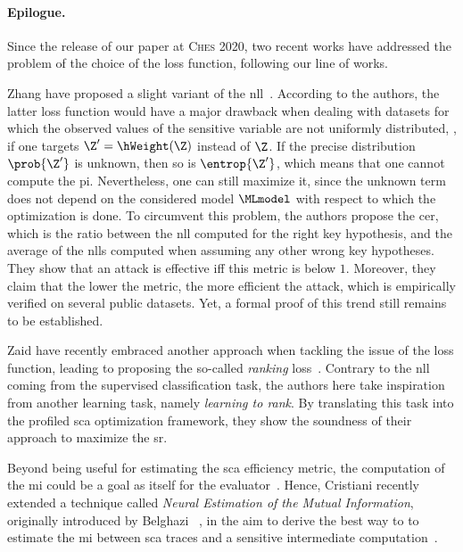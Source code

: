 \paragraph{Epilogue.}
Since the release of our paper at \textsc{Ches} 2020, two recent works have addressed the problem of the choice of the loss function, following our line of works.

Zhang \etal{} have proposed a slight variant of the \gls{nll}~\cite{zhang_novel_2020}.
According to the authors, the latter loss function would have a major drawback when dealing with datasets for which the observed values of the sensitive variable are not uniformly distributed, \eg{}, if one targets \(\Z' = \hWeight(\Z)\) instead of \(\Z\).
If the precise distribution \(\prob{\Z'}\) is unknown, then so is \(\entrop{\Z'}\), which means that one cannot compute the \gls{pi}.
Nevertheless, one can still maximize it, since the unknown term does not depend on the considered model \(\MLmodel\) with respect to which the optimization is done.
To circumvent this problem, the authors propose the \gls{cer}, which is the ratio between the \gls{nll} computed for the right key hypothesis, and the average of the \glspl{nll} computed when assuming any other wrong key hypotheses.
They show that an attack is effective \gls{iff} this metric is below \(1\).
Moreover, they claim that the lower the metric, the more efficient the attack, which is empirically verified on several public datasets.
Yet, a formal proof of this trend still remains to be established.

Zaid \etal{} have recently embraced another approach when tackling the issue of the loss function, leading to proposing the so-called \emph{ranking} loss~\cite{zaid_ranking_2020}.
Contrary to the \gls{nll} coming from the supervised classification task, the authors here take inspiration from another learning task, namely \emph{learning to rank}.
By translating this task into the profiled \gls{sca} optimization framework, they show the soundness of their approach to maximize the \gls{sr}.

Beyond being useful for estimating the \gls{sca} efficiency metric, the computation of the \gls{mi} could be a goal as itself for the evaluator~\cite{bronchain_leakage_2019}.
Hence, Cristiani \etal{} recently extended a technique called \emph{Neural Estimation of the Mutual Information}, originally introduced by Belghazi \etal{}~\cite{belghazi_mine_2018}, in the aim to derive the best way to to estimate the \gls{mi} between \gls{sca} traces and a sensitive intermediate computation~\cite{cristiani_leakage_2020}.